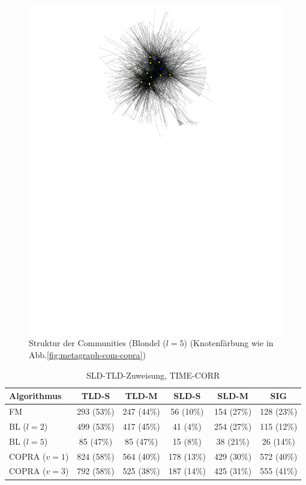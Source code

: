 \begin{figure}[h!]
  \centering
  \includegraphics[scale=1.6]{images/metagraph-blondel2-minsize4.pdf}
  \caption{Struktur der Communities (Blondel ($l=5$) (Knotenf\"arbung
    wie in Abb.\ref{fig:metagraph-com-copra})}
  \label{fig:metagraph-com-blondel2}
\end{figure}

\begin{table}[t]
  \centering
  \footnotesize
  \begin{tabular}{l|c|c|c|c|c}
    Algorithmus & TLD-S & TLD-M & SLD-S & SLD-M & SIG \\
    \hline
    FM & 293 (53\%) & 247 (44\%) & 56 (10\%) & 154 (27\%) & 128
    (23\%) \\
    \hline
    BL ($l=2$) & 499 (53\%) & 417 (45\%) & 41 (4\%) & 254 (27\%) & 115 (12\%) \\
    BL ($l=5$) & 85 (47\%) & 85 (47\%) & 15 (8\%) & 38 (21\%) & 26 (14\%) \\
    \hline
    COPRA ($v=1$) & 824 (58\%) & 564 (40\%) & 178 (13\%) & 429 (30\%)
    & 572 (40\%) \\
    COPRA ($v=3$) & 792 (58\%) & 525 (38\%) & 187 (14\%) & 425 (31\%) & 555
    (41\%)
  \end{tabular}
  \caption{SLD-TLD-Zuweisung, TIME-CORR}
  \label{tab:assign}
\end{table}


